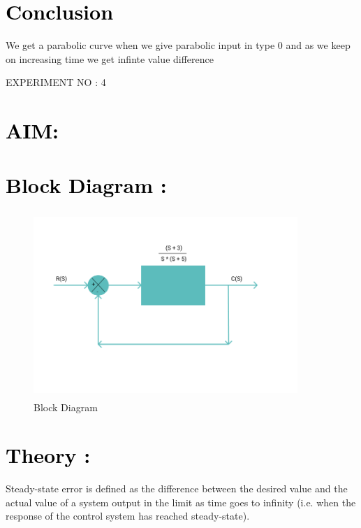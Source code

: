 \documentclass[12pt]{article}
\begin{document}
\section*{\textcolor{black}{Conclusion}}
 We get a parabolic curve when we give parabolic input in type 0 and as we keep on increasing time we get infinte value difference
 \pagebreak
 
 \begin{center}
    \LARGE {EXPERIMENT NO : 4}
             
\end{center}

\section*{\textcolor{black}{AIM: }}

\section*{\textcolor{black}{Block Diagram :}}
 \begin{figure}[!hth]
        \centering
        \includegraphics[width =10cm, height = 7cm]{images/exp4.png}
        \caption{Block Diagram}
        \label{Graph}
\end{figure}

\section*{\textcolor{black}{Theory :}}
Steady-state error is defined as the difference between the desired value and the actual value of a system output in the limit as time goes to infinity (i.e. when the response of the control system has reached steady-state).\par
\end{document}
